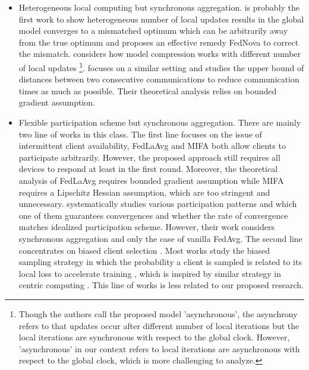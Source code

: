 \begin{itemize}[leftmargin=*]
    \item Heterogeneous local computing but synchronous aggregation. \cite{Wang20FedNova} is probably the first work to show heterogeneous number of local updates results in the global model converges to a mismatched optimum which can be arbitrarily away from the true optimum and proposes an effective remedy FedNova to correct the mismatch. \cite{Basu19Qsparse-Local-SGD} considers how model compression works with different number of local updates \footnote{Though the authors call the proposed model 'asynchronous', the asynchrony refers to that updates occur after different number of local iterations but the local iterations are synchronous with respect to the global clock. However, 'asynchronous' in our context refers to local iterations are asynchronous with respect to the global clock, which is more challenging to analyze.}. \cite{Avdiukhin21arbitrarycommunication} focuses on a similar setting and studies the upper bound of distances between two consecutive communications to reduce communication times as much as possible. Their theoretical analysis relies on bounded gradient assumption.
    \item Flexible participation scheme but synchronous aggregation. There are mainly two line of works in this class. The first line focuses on the issue of intermittent client availability, FedLaAvg \cite{Yan2020DistributedClient} and MIFA \cite{gu2021arbitraryunavailable} both allow clients to participate arbitrarily. However, the proposed approach still requires all devices to respond at least in the first round. Moreover, the theoretical analysis of FedLaAvg requires bounded gradient assumption while MIFA requires a Lipschitz Hessian assumption, which are too stringent and unnecessary. \cite{wang2022arbitraryparticipation} systematically studies various participation patterns and which one of them guarantees convergences and whether the rate of convergence matches idealized participation scheme. However, their work considers synchronous aggregation and only the case of vanilla FedAvg. The second line concentrates on biased client selection \citep{Nishio2018ClientSelection, Chen2020ClientSampling, cho22biased_selection}. Most works study the biased sampling strategy in which the probability a client is sampled is related to its local loss to accelerate training \citep{Goetz2019ActiveFL,Ribero2020clientsampling}, which is inspired by similar strategy in centric computing \citep{Salehi2017BanditSampling,Jiang2019Local_Loss,shah20local_loss,Katharopoulos2018ImportanceSampling}. This line of works is less related to our proposed research.

\end{itemize}
